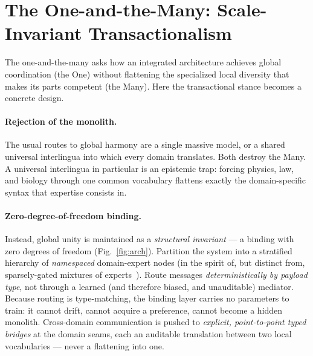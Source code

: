 \documentclass[11pt]{article}
\begin{document}
\section{The One-and-the-Many: Scale-Invariant Transactionalism}
\label{sec:many}

The one-and-the-many asks how an integrated architecture achieves global coordination (the One) without
flattening the specialized local diversity that makes its parts competent (the Many). Here the
transactional stance becomes a concrete design.

\paragraph{Rejection of the monolith.} The usual routes to global harmony are a single massive model, or
a shared universal interlingua into which every domain translates. Both destroy the Many. A universal
interlingua in particular is an epistemic trap: forcing physics, law, and biology through one common
vocabulary flattens exactly the domain-specific syntax that expertise consists in.

\paragraph{Zero-degree-of-freedom binding.} Instead, global unity is maintained as a \emph{structural
invariant} --- a binding with zero degrees of freedom (Fig.~\ref{fig:arch}). Partition the system into a
stratified hierarchy of \emph{namespaced} domain-expert nodes (in the spirit of, but distinct from,
sparsely-gated mixtures of experts~\cite{shazeer2017}). Route messages \emph{deterministically by
payload type}, not through a learned (and therefore biased, and unauditable) mediator. Because routing is
type-matching, the binding layer carries no parameters to train: it cannot drift, cannot acquire a
preference, cannot become a hidden monolith. Cross-domain communication is pushed to \emph{explicit,
point-to-point typed bridges} at the domain seams, each an auditable translation between two local
vocabularies --- never a flattening into one.
\end{document}
